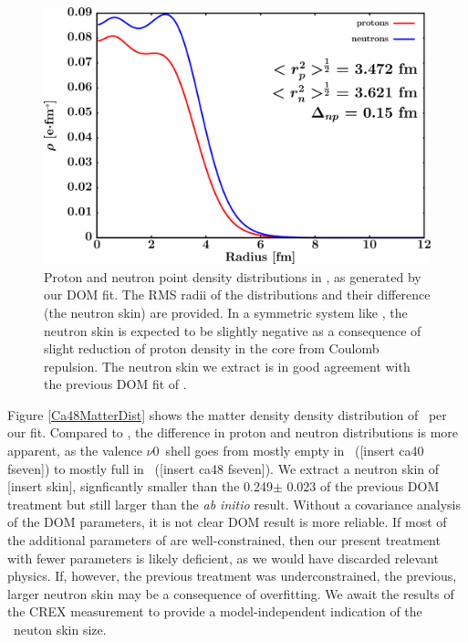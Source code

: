 \begin{figure}[tb]
    \centering
    \includegraphics[width=\textwidth]{figures/ca48_matterDensity.png}
    \caption[Proton and neutron matter density distributions in \caForty]
    {
        Proton and neutron point density distributions in \caForty, as
        generated by our DOM fit. The RMS radii of the distributions and their
        difference (the neutron skin) are provided. In a symmetric system like
        \caForty, the neutron skin is expected to be slightly negative as a
        consequence of slight reduction of proton density in the core from
        Coulomb repulsion. The neutron skin we extract is in good agreement with
        the previous DOM fit of \cite{MahzoonPhDThesis}.
    }
    \label{ca48MatterDist}
\end{figure}

Figure \ref{Ca48MatterDist} shows the matter density density distribution of \caEight\ per
our fit. Compared to \caForty, the difference in proton and neutron distributions is more apparent,
as the valence $\nu$0\fSeven\ shell goes from mostly empty in \caForty\ ([insert ca40 fseven]) to 
mostly full in \caForty\ ([insert ca48 fseven]). We extract a neutron skin of [insert skin],
signficantly smaller than the 0.249$\pm$ 0.023 \femto\meter of the previous DOM treatment
but still larger than the \textit{ab initio} result. Without a covariance analysis of the DOM
parameters, it is not clear DOM result is more reliable. If most of the additional parameters of
\cite{MahzoonPhDThesis} are well-constrained, then our present treatment with fewer parameters is 
likely deficient, as we would have discarded relevant physics. If, however, the previous treatment
was underconstrained, the previous, larger neutron skin may be a consequence of overfitting. We
await the results of the CREX measurement to provide a model-independent indication
of the \caEight\ neuton skin size.


